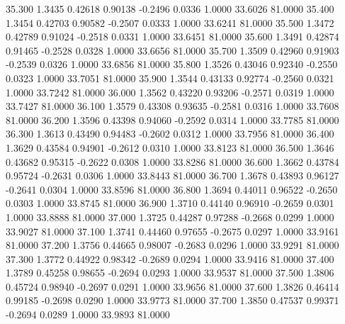   35.300   1.3435   0.42618   0.90138  -0.2496   0.0336   1.0000  33.6026  81.0000
  35.400   1.3454   0.42703   0.90582  -0.2507   0.0333   1.0000  33.6241  81.0000
  35.500   1.3472   0.42789   0.91024  -0.2518   0.0331   1.0000  33.6451  81.0000
  35.600   1.3491   0.42874   0.91465  -0.2528   0.0328   1.0000  33.6656  81.0000
  35.700   1.3509   0.42960   0.91903  -0.2539   0.0326   1.0000  33.6856  81.0000
  35.800   1.3526   0.43046   0.92340  -0.2550   0.0323   1.0000  33.7051  81.0000
  35.900   1.3544   0.43133   0.92774  -0.2560   0.0321   1.0000  33.7242  81.0000
  36.000   1.3562   0.43220   0.93206  -0.2571   0.0319   1.0000  33.7427  81.0000
  36.100   1.3579   0.43308   0.93635  -0.2581   0.0316   1.0000  33.7608  81.0000
  36.200   1.3596   0.43398   0.94060  -0.2592   0.0314   1.0000  33.7785  81.0000
  36.300   1.3613   0.43490   0.94483  -0.2602   0.0312   1.0000  33.7956  81.0000
  36.400   1.3629   0.43584   0.94901  -0.2612   0.0310   1.0000  33.8123  81.0000
  36.500   1.3646   0.43682   0.95315  -0.2622   0.0308   1.0000  33.8286  81.0000
  36.600   1.3662   0.43784   0.95724  -0.2631   0.0306   1.0000  33.8443  81.0000
  36.700   1.3678   0.43893   0.96127  -0.2641   0.0304   1.0000  33.8596  81.0000
  36.800   1.3694   0.44011   0.96522  -0.2650   0.0303   1.0000  33.8745  81.0000
  36.900   1.3710   0.44140   0.96910  -0.2659   0.0301   1.0000  33.8888  81.0000
  37.000   1.3725   0.44287   0.97288  -0.2668   0.0299   1.0000  33.9027  81.0000
  37.100   1.3741   0.44460   0.97655  -0.2675   0.0297   1.0000  33.9161  81.0000
  37.200   1.3756   0.44665   0.98007  -0.2683   0.0296   1.0000  33.9291  81.0000
  37.300   1.3772   0.44922   0.98342  -0.2689   0.0294   1.0000  33.9416  81.0000
  37.400   1.3789   0.45258   0.98655  -0.2694   0.0293   1.0000  33.9537  81.0000
  37.500   1.3806   0.45724   0.98940  -0.2697   0.0291   1.0000  33.9656  81.0000
  37.600   1.3826   0.46414   0.99185  -0.2698   0.0290   1.0000  33.9773  81.0000
  37.700   1.3850   0.47537   0.99371  -0.2694   0.0289   1.0000  33.9893  81.0000
